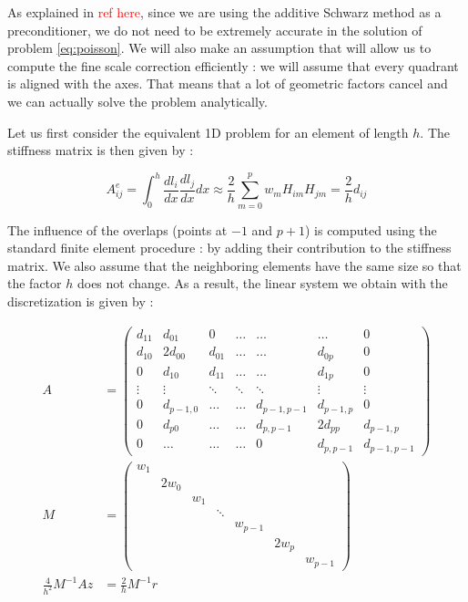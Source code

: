 As explained in \textcolor{red}{ref here}, since we are using the additive Schwarz method as a preconditioner, we do not need to be extremely accurate in the solution of problem \ref{eq:poisson}. We will also make an assumption that will allow us to compute the fine scale correction efficiently : we will assume that every quadrant is aligned with the axes. That means that a lot of geometric factors cancel and we can actually solve the problem analytically.

Let us first consider the equivalent 1D problem for an element of length $h$. The stiffness matrix is then given by : 

$$A^e_{ij} = \int_0^h  \frac{dl_i}{dx}\frac{dl_j}{dx} dx \approx \frac{2}{h} \sum_{m=0}^p w_mH_{im}H_{jm} = \frac{2}{h} d_{ij}$$

The influence of the overlaps (points at $-1$ and $p+1$) is computed using the standard finite element procedure : by adding their contribution to the stiffness matrix. We also assume that the neighboring elements have the same size so that the factor $h$ does not change. As a result, the linear system we obtain with the discretization is given by : 

\begin{align*}
A&= \begin{pmatrix}
d_{11} & d_{01} & 0 & \hdots & \hdots &\hdots & 0\\
d_{10} & 2d_{00} & d_{01} & \hdots & \hdots & d_{0p} & 0 \\
0 & d_{10} & d_{11} & \hdots & \hdots & d_{1p} & 0\\
\vdots & \vdots & \ddots & \ddots & \ddots & \vdots &\vdots \\
0 & d_{p-1,0} & \hdots & \hdots & d_{p-1,p-1} & d_{p-1,p} & 0\\
0 & d_{p0} & \hdots & \hdots & d_{p,p-1} & 2d_{pp} & d_{p-1,p}\\
0 & \hdots & \hdots & \hdots & 0 & d_{p,p-1} & d_{p-1,p-1}
\end{pmatrix}\\
M &= \begin{pmatrix}
w_1 & & & & & & \\
& 2w_0 & & & & & \\
& & w_1 & & & & \\
& & & \ddots & & &\\
& & & & w_{p-1} & &\\
& & & & & 2w_p & \\
& & & & & & w_{p-1}
\end{pmatrix}\\
\frac{4}{h^2}M^{-1}A z &= \frac{2}{h}M^{-1}r
\end{align*}

